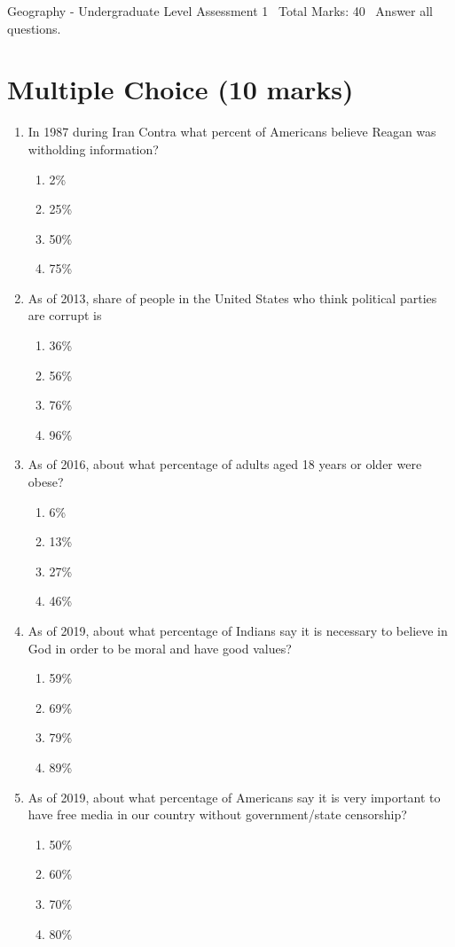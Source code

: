 \documentclass[12pt]{article}
\begin{document}
\begin{center}
Geography - Undergraduate Level Assessment 1 \
Total Marks: 40 \
Answer all questions.
\end{center}

\section*{Multiple Choice (10 marks)}
\begin{enumerate}[label=\arabic*.]
\item In 1987 during Iran Contra what percent of Americans believe Reagan was witholding information?
\begin{enumerate}[label=(\alph*)]
    \item 2\%
    \item 25\%
    \item 50\%
    \item 75\%
\end{enumerate}
\item As of 2013, share of people in the United States who think political parties are corrupt is
\begin{enumerate}[label=(\alph*)]
    \item 36\%
    \item 56\%
    \item 76\%
    \item 96\%
\end{enumerate}
\item As of 2016, about what percentage of adults aged 18 years or older were obese?
\begin{enumerate}[label=(\alph*)]
    \item 6\%
    \item 13\%
    \item 27\%
    \item 46\%
\end{enumerate}
\item As of 2019, about what percentage of Indians say it is necessary to believe in God in order to be moral and have good values?
\begin{enumerate}[label=(\alph*)]
    \item 59\%
    \item 69\%
    \item 79\%
    \item 89\%
\end{enumerate}
\item As of 2019, about what percentage of Americans say it is very important to have free media in our country without government/state censorship?
\begin{enumerate}[label=(\alph*)]
    \item 50\%
    \item 60\%
    \item 70\%
    \item 80\%
\end{enumerate}
\end{enumerate}
\end{document}
